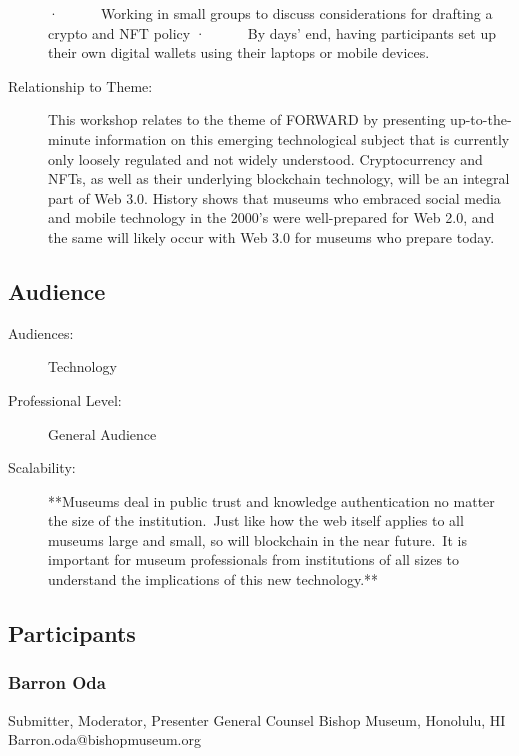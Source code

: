 \documentclass{report}
\begin{document}
\begin{description}
·      Working in small groups to discuss considerations for drafting a crypto and NFT policy
·      By days’ end, having participants set up their own digital wallets using their laptops or mobile devices.
							    \item [Relationship to Theme:]This workshop relates to the theme of FORWARD by presenting up-to-the-minute information on this emerging technological subject that is currently only loosely regulated and not widely understood.  Cryptocurrency and NFTs, as well as their underlying blockchain technology, will be an integral part of Web 3.0.  History shows that museums who embraced social media and mobile technology in the 2000’s were well-prepared for Web 2.0, and the same will likely occur with Web 3.0 for museums who prepare today.
							    
                \end{description}
              \subsection*{Audience}
                \begin{description}
                  \item [Audiences:]Technology~
                  \item[Professional Level:]General Audience~
                \item[Scalability:] **Museums deal in public trust and knowledge authentication no matter the size of the institution. Just like how the web itself applies to all museums large and small, so will blockchain in the near future. It is important for museum professionals from institutions of all sizes to understand the implications of this new technology.**

							
              \end{description}
            \subsection*{Participants}
              \subsubsection*{ Barron Oda }
              Submitter, Moderator, Presenter\newline
              General Counsel\newline
              Bishop Museum, Honolulu, HI
              \newline
              Barron.oda@bishopmuseum.org\newline
              
\end{document}
